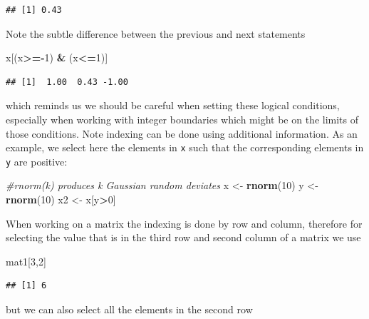 \documentclass[]{book}
\newenvironment{Shaded}{\begin{snugshade}}{\end{snugshade}}
\newcommand{\KeywordTok}[1]{\textcolor[rgb]{0.13,0.29,0.53}{\textbf{#1}}}
\newcommand{\DecValTok}[1]{\textcolor[rgb]{0.00,0.00,0.81}{#1}}
\newcommand{\StringTok}[1]{\textcolor[rgb]{0.31,0.60,0.02}{#1}}
\newcommand{\CommentTok}[1]{\textcolor[rgb]{0.56,0.35,0.01}{\textit{#1}}}
\newcommand{\OperatorTok}[1]{\textcolor[rgb]{0.81,0.36,0.00}{\textbf{#1}}}
\newcommand{\NormalTok}[1]{#1}
\theoremstyle{definition}
\theoremstyle{definition}
\theoremstyle{remark}
\begin{document}
\begin{verbatim}
## [1] 0.43
\end{verbatim}

Note the subtle difference between the previous and next statements

\begin{Shaded}
\begin{Highlighting}[]
\NormalTok{x[(x}\OperatorTok{>=-}\DecValTok{1}\NormalTok{) }\OperatorTok{&}\StringTok{ }\NormalTok{(x}\OperatorTok{<=}\DecValTok{1}\NormalTok{)]}
\end{Highlighting}
\end{Shaded}

\begin{verbatim}
## [1]  1.00  0.43 -1.00
\end{verbatim}

which reminds us we should be careful when setting these logical
conditions, especially when working with integer boundaries which might
be on the limits of those conditions. Note indexing can be done using
additional information. As an example, we select here the elements in
\texttt{x} such that the corresponding elements in \texttt{y} are
positive:

\begin{Shaded}
\begin{Highlighting}[]
\CommentTok{#rnorm(k) produces k Gaussian random deviates}
\NormalTok{x <-}\StringTok{ }\KeywordTok{rnorm}\NormalTok{(}\DecValTok{10}\NormalTok{)}
\NormalTok{y <-}\StringTok{ }\KeywordTok{rnorm}\NormalTok{(}\DecValTok{10}\NormalTok{)}
\NormalTok{x2 <-}\StringTok{ }\NormalTok{x[y}\OperatorTok{>}\DecValTok{0}\NormalTok{]}
\end{Highlighting}
\end{Shaded}

When working on a matrix the indexing is done by row and column,
therefore for selecting the value that is in the third row and second
column of a matrix we use

\begin{Shaded}
\begin{Highlighting}[]
\NormalTok{mat1[}\DecValTok{3}\NormalTok{,}\DecValTok{2}\NormalTok{]}
\end{Highlighting}
\end{Shaded}

\begin{verbatim}
## [1] 6
\end{verbatim}

but we can also select all the elements in the second row
\end{document}
